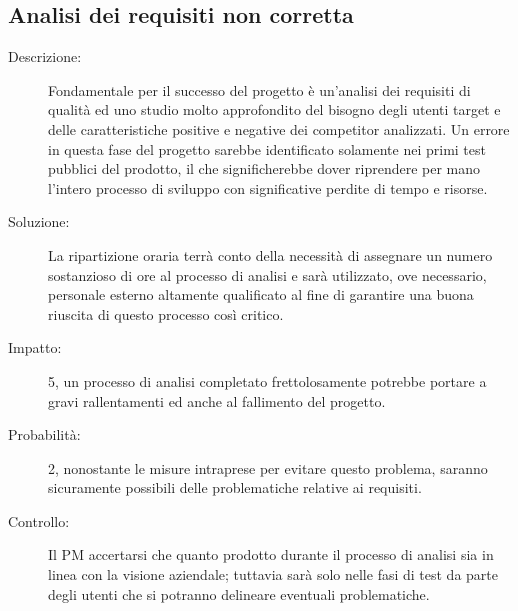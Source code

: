 \subsection{Analisi dei requisiti non corretta}
\begin{description}
\item[Descrizione:] Fondamentale per il successo del progetto è un'analisi dei requisiti di
qualità ed uno studio molto approfondito del bisogno degli utenti target e delle
caratteristiche positive e negative dei competitor analizzati. Un errore in questa fase
del progetto sarebbe identificato solamente nei primi test pubblici del prodotto,
il che significherebbe dover riprendere per mano l'intero processo di sviluppo con
significative perdite di tempo e risorse.
\item[Soluzione:] La ripartizione oraria terrà conto della necessità di assegnare un numero
sostanzioso di ore al processo di analisi e sarà utilizzato, ove necessario,
personale esterno altamente qualificato al fine di garantire una buona riuscita di
questo processo così critico. 
\item[Impatto:] 5, un processo di analisi completato frettolosamente potrebbe portare a gravi rallentamenti ed anche al fallimento del progetto.
\item[Probabilità:] 2, nonostante le misure intraprese per evitare questo problema, saranno sicuramente possibili delle problematiche relative ai requisiti.
\item[Controllo:] Il PM  accertarsi che quanto prodotto durante il processo di analisi sia in linea con la visione aziendale; tuttavia sarà solo nelle fasi di test da parte degli utenti che si potranno delineare eventuali problematiche.
\end{description}

